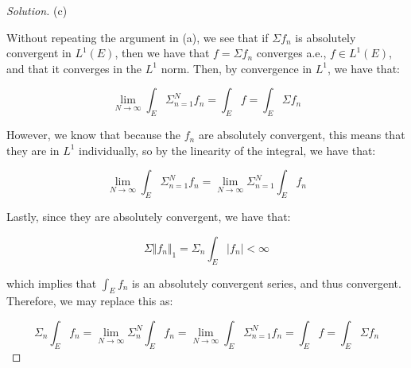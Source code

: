 \documentclass[10pt]{article}
\begin{document}
\begin{proof}[Solution]
(c)

Without repeating the argument in (a), we see that if $\Sigma f_n$ is absolutely convergent in $L^1(E)$, then we have that $f = \Sigma f_n$ converges a.e., $f \in L^1(E)$, and that it converges in the $L^1$ norm. Then, by convergence in $L^1$, we have that:

$$ \lim_{N \to \infty} \int_E \Sigma_{n=1}^N f_n = \int_E f = \int_E \Sigma f_n $$

However, we know that because the $f_n$ are absolutely convergent, this means that they are in $L^1$ individually, so by the linearity of the integral, we have that:

$$ \lim_{N \to \infty} \int_E \Sigma_{n=1}^N f_n = \lim_{N \to \infty} \Sigma_{n=1}^N \int_E f_n $$

Lastly, since they are absolutely convergent, we have that:

$$ \Sigma \Vert f_n \Vert_1 = \Sigma_n \int_E |f_n| < \infty $$

which implies that $\int_E f_n$ is an absolutely convergent series, and thus convergent. Therefore, we may replace this as:

$$\Sigma_n \int_E f_n = \lim_{N \to \infty} \Sigma_n^N \int_E f_n =  \lim_{N \to \infty} \int_E \Sigma_{n=1}^N f_n = \int_E f = \int_E \Sigma f_n $$


\end{proof}
\end{document}
